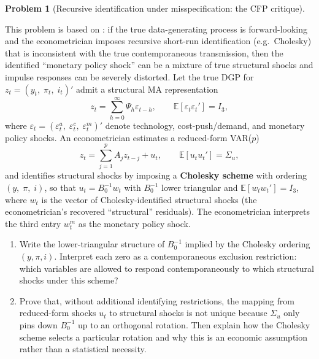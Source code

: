 \documentclass[12pt]{article}
\newcommand{\E}{\mathbb E}
\theoremstyle{definition} %
\newtheorem{problem}{Problem}
\theoremstyle{plain}
\begin{document}
\begin{problem}[Recursive identification under misspecification: the CFP critique]
\label{prob:cfp}

This problem is based on \citet{CarlstromFuerstPaustian2009}: if the true data-generating process is forward-looking and the econometrician imposes recursive short-run identification (e.g.\ Cholesky) that is inconsistent with the true contemporaneous transmission, then the identified ``monetary policy shock'' can be a mixture of true structural shocks and impulse responses can be severely distorted. Let the true DGP for $z_t = (y_t,\; \pi_t,\; i_t)'$ admit a structural MA representation
\begin{equation}
z_t = \sum_{h=0}^{\infty} \Psi_h \varepsilon_{t-h},
\qquad \E[\varepsilon_t \varepsilon_t'] = I_3,
\end{equation}
where $\varepsilon_t = (\varepsilon_t^a,\; \varepsilon_t^c,\; \varepsilon_t^m)'$ denote technology, cost-push/demand, and monetary policy shocks. An econometrician estimates a reduced-form VAR($p$)
\begin{equation}
z_t = \sum_{j=1}^p A_j z_{t-j} + u_t,
\qquad \E[u_t u_t'] = \Sigma_u,
\end{equation}
and identifies structural shocks by imposing a \textbf{Cholesky scheme} with ordering $(y,\;\pi,\;i)$, so that $u_t = B_0^{-1} w_t$ with $B_0^{-1}$ lower triangular and $\E[w_t w_t'] = I_3$, where $w_t$ is the vector of Cholesky-identified structural shocks (the econometrician's recovered ``structural'' residuals). The econometrician interprets the third entry $w_t^m$ as the monetary policy shock.

\begin{enumerate}[label=(\alph*)]
\item Write the lower-triangular structure of $B_0^{-1}$ implied by the Cholesky ordering $(y,\pi,i)$. Interpret each zero as a contemporaneous exclusion restriction: which variables are allowed to respond contemporaneously to which structural shocks under this scheme?

\item Prove that, without additional identifying restrictions, the mapping from reduced-form shocks $u_t$ to structural shocks is not unique because $\Sigma_u$ only pins down $B_0^{-1}$ up to an orthogonal rotation. Then explain how the Cholesky scheme selects a particular rotation and why this is an economic assumption rather than a statistical necessity.


\end{enumerate}
\end{problem}
\end{document}

